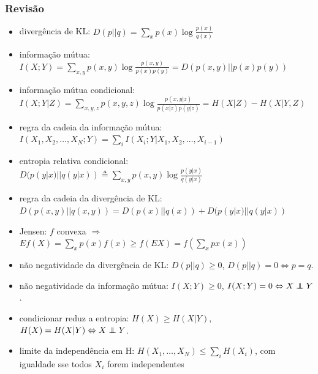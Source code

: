 \begin{frame}[allowframebreaks]
  \frametitle{Revisão}
  \begin{itemize}
  \item divergência de KL: $D(p||q) = \sum_x p(x) \log \frac{p(x)}{q(x)}$
  \item informação mútua: $I(X;Y) = \sum_{x,y} p(x,y) \log \frac{p(x,y)}{p(x)p(y)} = D(p(x,y)||p(x)p(y))$ 
  \item informação mútua condicional: $I(X;Y|Z) = \sum_{x,y,z} p(x,y,z) \log \frac{p(x,y|z)}{p(x|z) p(y|z)} = H(X|Z) - H(X|Y,Z)$
  \item regra da cadeia da informação mútua: $I(X_1,X_2,\ldots,X_N;Y)=\sum_i I(X_i;Y|X_1,X_2,\ldots,X_{i-1})$
  \item entropia relativa condicional: $D(p(y|x)||q(y|x)) \triangleq \sum_{x,y} p(x,y) \log \frac{p(y|x)}{q(y|x)}$
  \item regra da cadeia da divergência de KL: $D(p(x,y)||q(x,y)) = D(p(x)||q(x)) + D(p(y|x)||q(y|x))$
  \item Jensen: $f$ convexa $\Rightarrow$ $E f(X) = \sum_x p(x) f(x) \geq f(E X) = f \left( \sum_x p x(x) \right)$
  \item não negatividade da divergência de KL: $D(p||q) \geq 0$, $D(p||q)=0 \Leftrightarrow p=q$.
  \item não negatividade da informação mútua: $I(X;Y)\geq 0$, $I(X;Y)=0 \Leftrightarrow X \independent Y$.
  \item condicionar reduz a entropia: $H(X) \geq H(X|Y)$, $H(X) = H(X|Y) \Leftrightarrow X \independent Y$.
  \item limite da independência em H: $H(X_1,\ldots,X_N) \leq \sum_{i} H(X_i)$, com igualdade sse todos $X_i$ forem independentes
  \end{itemize}
\end{frame}


